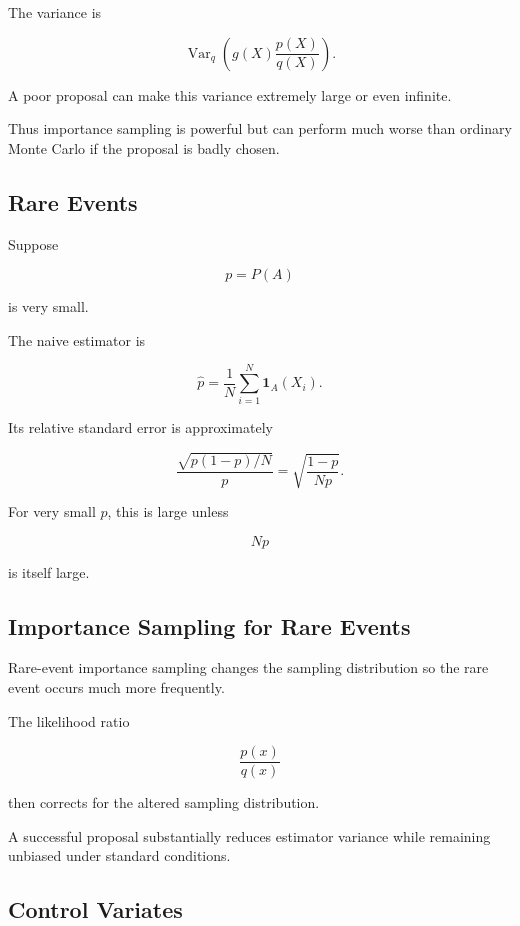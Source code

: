 The variance is

\[
\boxed{
\operatorname{Var}_q
\left(
g(X)\frac{p(X)}{q(X)}
\right).
}
\]

A poor proposal can make this variance extremely large or even infinite.

Thus importance sampling is powerful but can perform much worse than
ordinary Monte Carlo if the proposal is badly chosen.

\subsection{Rare Events}
\label{subsec:rare-event-monte-carlo}

Suppose

\[
p=P(A)
\]

is very small.

The naive estimator is

\[
\widehat{p}
=
\frac1N
\sum_{i=1}^{N}
\mathbf{1}_A(X_i).
\]

Its relative standard error is approximately

\[
\boxed{
\frac{
\sqrt{p(1-p)/N}
}{
p
}
=
\sqrt{
\frac{
1-p
}{
Np
}
}.
}
\]

For very small \(p\), this is large unless

\[
Np
\]

is itself large.

\subsection{Importance Sampling for Rare Events}
\label{subsec:importance-sampling-rare-events}

Rare-event importance sampling changes the sampling distribution so the
rare event occurs much more frequently.

The likelihood ratio

\[
\boxed{
\frac{p(x)}{q(x)}
}
\]

then corrects for the altered sampling distribution.

A successful proposal substantially reduces estimator variance while
remaining unbiased under standard conditions.

\subsection{Control Variates}
\label{subsec:control-variates}

